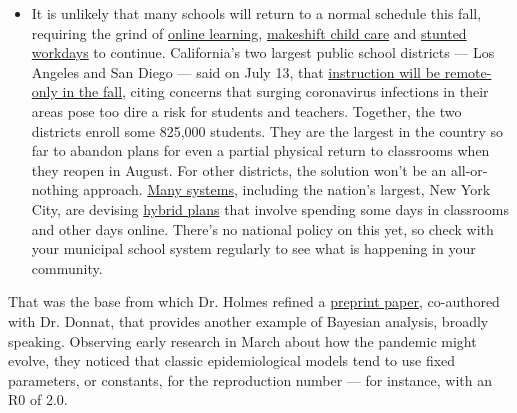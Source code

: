 \begin{itemize}
  \begin{itemize}
  \tightlist
  \item
    It is unlikely that many schools will return to a normal schedule
    this fall, requiring the grind of
    \href{https://www.nytimes.com/2020/06/05/us/coronavirus-education-lost-learning.html?action=click\&pgtype=Article\&state=default\&region=MAIN_CONTENT_3\&context=storylines_faq}{online
    learning},
    \href{https://www.nytimes.com/2020/05/29/us/coronavirus-child-care-centers.html?action=click\&pgtype=Article\&state=default\&region=MAIN_CONTENT_3\&context=storylines_faq}{makeshift
    child care} and
    \href{https://www.nytimes.com/2020/06/03/business/economy/coronavirus-working-women.html?action=click\&pgtype=Article\&state=default\&region=MAIN_CONTENT_3\&context=storylines_faq}{stunted
    workdays} to continue. California's two largest public school
    districts --- Los Angeles and San Diego --- said on July 13, that
    \href{https://www.nytimes.com/2020/07/13/us/lausd-san-diego-school-reopening.html?action=click\&pgtype=Article\&state=default\&region=MAIN_CONTENT_3\&context=storylines_faq}{instruction
    will be remote-only in the fall}, citing concerns that surging
    coronavirus infections in their areas pose too dire a risk for
    students and teachers. Together, the two districts enroll some
    825,000 students. They are the largest in the country so far to
    abandon plans for even a partial physical return to classrooms when
    they reopen in August. For other districts, the solution won't be an
    all-or-nothing approach.
    \href{https://bioethics.jhu.edu/research-and-outreach/projects/eschool-initiative/school-policy-tracker/}{Many
    systems}, including the nation's largest, New York City, are
    devising
    \href{https://www.nytimes.com/2020/06/26/us/coronavirus-schools-reopen-fall.html?action=click\&pgtype=Article\&state=default\&region=MAIN_CONTENT_3\&context=storylines_faq}{hybrid
    plans} that involve spending some days in classrooms and other days
    online. There's no national policy on this yet, so check with your
    municipal school system regularly to see what is happening in your
    community.
  \end{itemize}
\end{itemize}

That was the base from which Dr. Holmes refined a
\href{https://arxiv.org/abs/2004.05272}{preprint paper}, co-authored
with Dr. Donnat, that provides another example of Bayesian analysis,
broadly speaking. Observing early research in March about how the
pandemic might evolve, they noticed that classic epidemiological models
tend to use fixed parameters, or constants, for the reproduction number
--- for instance, with an R0 of 2.0.

